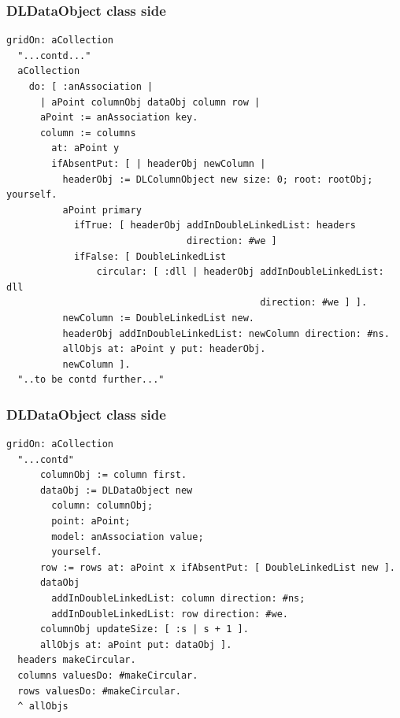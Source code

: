 \documentclass[10pt]{beamer}
\begin{document}
\begin{frame}[fragile]
\frametitle{DLDataObject class side}
\begin{verbatim}
gridOn: aCollection
  "...contd..."
  aCollection
    do: [ :anAssociation | 
      | aPoint columnObj dataObj column row |
      aPoint := anAssociation key.
      column := columns
        at: aPoint y
        ifAbsentPut: [ | headerObj newColumn |
          headerObj := DLColumnObject new size: 0; root: rootObj; yourself.
          aPoint primary
            ifTrue: [ headerObj addInDoubleLinkedList: headers 
                                direction: #we ]
            ifFalse: [ DoubleLinkedList
                circular: [ :dll | headerObj addInDoubleLinkedList: dll 
                                             direction: #we ] ].
          newColumn := DoubleLinkedList new.
          headerObj addInDoubleLinkedList: newColumn direction: #ns.
          allObjs at: aPoint y put: headerObj.
          newColumn ].
  "..to be contd further..."
\end{verbatim}
\end{frame}

\begin{frame}[fragile]
\frametitle{DLDataObject class side}
\begin{verbatim}
gridOn: aCollection
  "...contd"
      columnObj := column first.
      dataObj := DLDataObject new
        column: columnObj;
        point: aPoint;
        model: anAssociation value;
        yourself.
      row := rows at: aPoint x ifAbsentPut: [ DoubleLinkedList new ].
      dataObj
        addInDoubleLinkedList: column direction: #ns;
        addInDoubleLinkedList: row direction: #we.
      columnObj updateSize: [ :s | s + 1 ].
      allObjs at: aPoint put: dataObj ].
  headers makeCircular.
  columns valuesDo: #makeCircular.
  rows valuesDo: #makeCircular.
  ^ allObjs
\end{verbatim}
\end{frame}
\end{document}
